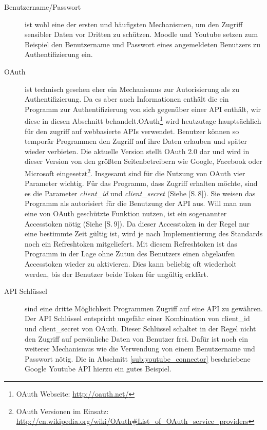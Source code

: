 \begin{description}
    \item[Benutzername/Passwort] ist wohl eine der ersten und häufigsten Mechanismen, um den Zugriff sensibler Daten vor Dritten zu schützen. Moodle und Youtube setzen zum Beispiel den Benutzername und Passwort eines angemeldeten Benutzers zu Authentifizierung ein.
    
    \item[OAuth] ist technisch gesehen eher ein Mechanismus zur Autorisierung als zu Authentifizierung. Da es aber auch Informationen enthält die ein Programm zur Authentifizierung von sich gegenüber einer API enthält, wir diese in diesen Abschnitt behandelt.OAuth\footnote{OAuth Webseite: \url{http://oauth.net/}} wird heutzutage hauptsächlich für den zugriff auf webbasierte APIs verwendet. Benutzer können so temporär Programmen den Zugriff auf ihre Daten erlauben und später wieder verbieten. Die aktuelle Version stellt OAuth 2.0 dar und wird in dieser Version von den größten Seitenbetreibern wie Google, Facebook oder Microsoft eingesetzt\footnote{OAuth Versionen im Einsatz: \url{http://en.wikipedia.org/wiki/OAuth\#List\_of\_OAuth\_service\_providers}}. Insgesamt sind für die Nutzung von OAuth vier Parameter wichtig. Für das Programm, dass Zugriff erhalten möchte, sind es die Parameter \emph{client\_id} und \emph{client\_secret} (Siehe \cite{rfc6749}[S.\,8]). Sie weisen das Programm als autorisiert für die Benutzung der API aus. Will man nun eine von OAuth geschützte Funktion nutzen, ist ein sogenannter Accesstoken nötig (Siehe \cite{rfc6749}[S.\,9]). Da dieser Accesstoken in der Regel nur eine bestimmte Zeit gültig ist, wird je nach Implementierung des Standards noch ein Refreshtoken mitgeliefert. Mit diesem Refreshtoken ist das Programm in der Lage ohne Zutun des Benutzers einen abgelaufen Accesstoken wieder zu aktivieren. Dies kann beliebig oft wiederholt werden, bis der Benutzer beide Token für ungültig erklärt. 
    
    \item[API Schlüssel] sind eine dritte Möglichkeit Programmen Zugriff auf eine API zu gewähren. Der API Schlüssel entspricht ungefähr einer Kombination von client\_id und client\_secret von OAuth. Dieser Schlüssel schaltet in der Regel nicht den Zugriff auf persönliche Daten von Benutzer frei. Dafür ist noch ein weiterer Mechanismus wie die Verwendung von einem Benutzername und Passwort nötig. Die in Abschnitt \ref{sub:youtube_connector}  beschriebene Google Youtube API hierzu ein gutes Beispiel.
\end{description}

